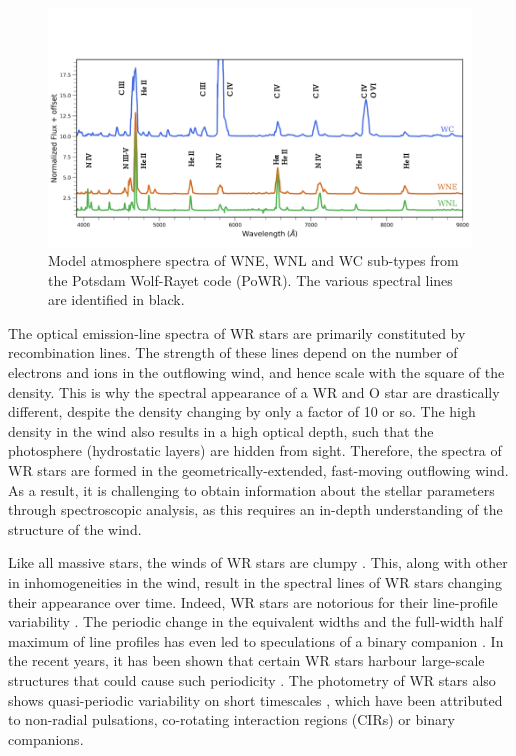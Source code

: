 \begin{figure}
    \centering
    \includegraphics[width=\textwidth]{chapters/introduction/image/Spectypes.png}
    \caption{Model atmosphere spectra of WNE, WNL and WC sub-types from the Potsdam Wolf-Rayet code (PoWR). The various spectral lines are identified in black.}
    \label{fig:spectypes}
\end{figure}

The optical emission-line spectra of WR stars are primarily constituted by recombination lines. The strength of these lines depend on the number of electrons and ions in the outflowing wind, and hence scale with the square of the density. This is why the spectral appearance of a WR and O star are drastically different, despite the density changing by only a factor of 10 or so. The high density in the wind also results in a high optical depth, such that the photosphere (hydrostatic layers) are hidden from sight. Therefore, the spectra of WR stars are formed in the geometrically-extended, fast-moving outflowing wind. As a result, it is challenging to obtain information about the stellar parameters through spectroscopic analysis, as this requires an in-depth understanding of the structure of the wind. 

Like all massive stars, the winds of WR stars are clumpy \citep{puls_bright_2006,fullerton_discordance_2006}. This, along with other in inhomogeneities in the wind, result in the spectral lines of WR stars changing their appearance over time. Indeed, WR stars are notorious for their line-profile variability \citep{lepine_wind_1996,lepine_wind_2000,st-louis_systematic_2009,chene_systematic_2011,chene_clumping_2020}. The periodic change in the equivalent widths  and the full-width half maximum of line profiles has even led to speculations of a binary companion \citep[e.g. WR 1][]{morel_investigation_1999}. In the recent years, it has been shown that certain WR stars harbour large-scale structures that could cause such periodicity \citep[e.g.][]{st-louis_measuring_2008,st-louis_polarization_2018,aldoretta_extensive_2016}. The photometry of WR stars also shows quasi-periodic variability on short timescales \citep[e.g.][]{moffat_photometric_1986,balona_intensive_1989,st-louis_brite_2020}, which have been attributed to non-radial pulsations, co-rotating interaction regions (CIRs) or binary companions. 


